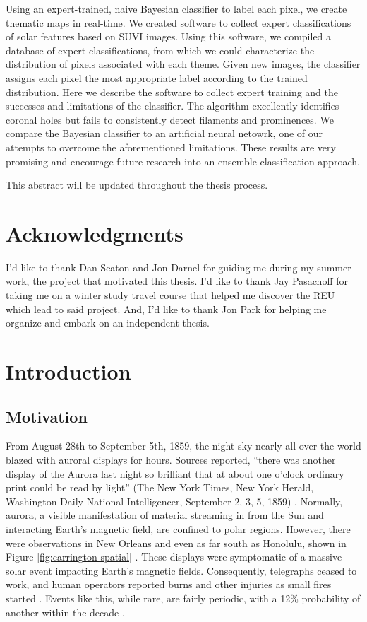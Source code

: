 \documentclass[twoside]{report}
\begin{document}
Using an expert-trained, naive Bayesian classifier to label each pixel, we create thematic maps in real-time. We created software to collect expert classifications of solar features based on SUVI images. Using this software, we compiled a database of expert classifications, from which we could characterize the distribution of pixels associated with each theme. Given new images, the classifier assigns each pixel the most appropriate label according to the trained distribution. Here we describe the software to collect expert training and the successes and limitations of the classifier. The algorithm excellently identifies coronal holes but fails to consistently detect filaments and prominences. We compare the Bayesian classifier to an artificial neural netowrk, one of our attempts to overcome the aforementioned limitations. These results are very promising and encourage future research into an ensemble classification approach.

This abstract will be updated throughout the thesis process.

\chapter*{Acknowledgments}
I'd like to thank Dan Seaton and Jon Darnel for guiding me during my summer work, the project that motivated this thesis. I'd like to thank Jay Pasachoff for taking me on a winter study travel course that helped me discover the REU which lead to said project. And, I'd like to thank Jon Park for helping me organize and embark on an independent thesis.

\chapter{Introduction}
\section{Motivation}
From August 28th to September 5th, 1859, the night sky nearly all over the world blazed with auroral displays for hours. Sources reported, ``there was another display of the Aurora last night so brilliant that at about one o’clock ordinary print could be read by light'' (The New York Times, New York Herald, Washington Daily National Intelligencer, September 2, 3, 5, 1859) \cite{green:2006}. Normally, aurora, a visible manifestation of material streaming in from the Sun and interacting Earth's magnetic field, are confined to polar regions. However, there were observations in New Orleans and even as far south as Honolulu, shown in Figure \ref{fig:carrington-spatial}  \cite{cliver:2004}. These displays were symptomatic of a massive solar event impacting Earth's magnetic fields. Consequently, telegraphs ceased to work, and human operators reported burns and other injuries as small fires started \cite{green:2006}. Events like this, while rare, are fairly periodic, with a 12\% probability of another within the decade \cite{riley:2012}. 
\end{document}
